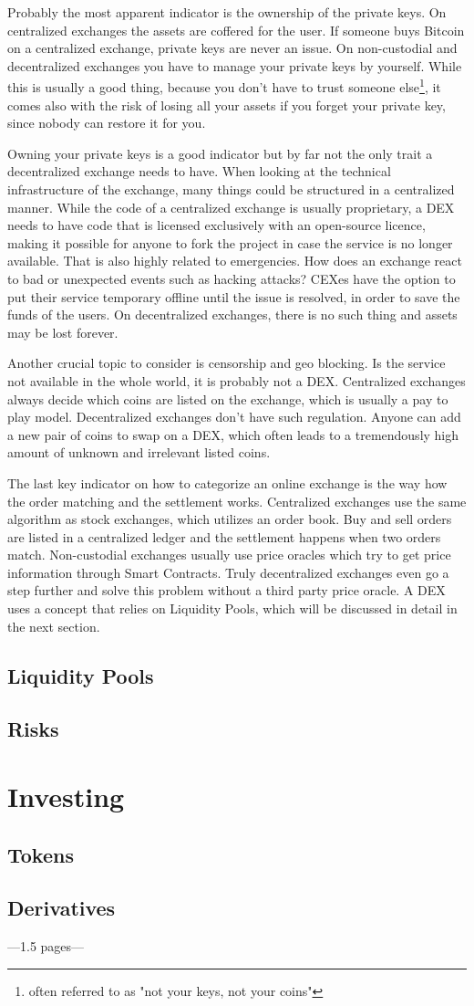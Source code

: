 Probably the most apparent indicator is the ownership of the private keys. On centralized exchanges the assets are coffered for the user. If someone buys Bitcoin on a centralized exchange, private keys are never an issue. On non-custodial and decentralized exchanges you have to manage your private keys by yourself. While this is usually a good thing, because you don't have to trust someone else\footnote{often referred to as "not your keys, not your coins"}, it comes also with the risk of losing all your assets if you forget your private key, since nobody can restore it for you.

Owning your private keys is a good indicator but by far not the only trait a decentralized exchange needs to have. When looking at the technical infrastructure of the exchange, many things could be structured in a centralized manner. While the code of a centralized exchange is usually proprietary, a DEX needs to have code that is licensed exclusively with an open-source licence, making it possible for anyone to fork the project in case the service is no longer available. That is also highly related to emergencies. How does an exchange react to bad or unexpected events such as hacking attacks? CEXes have the option to put their service temporary offline until the issue is resolved, in order to save the funds of the users. On decentralized exchanges, there is no such thing and assets may be lost forever.

Another crucial topic to consider is censorship and geo blocking. Is the service not available in the whole world, it is probably not a DEX. Centralized exchanges always decide which coins are listed on the exchange, which is usually a pay to play model. Decentralized exchanges don't have such regulation. Anyone can add a new pair of coins to swap on a DEX, which often leads to a tremendously high amount of unknown and irrelevant listed coins.

The last key indicator on how to categorize an online exchange is the way how the order matching and the settlement works. Centralized exchanges use the same algorithm as stock exchanges, which utilizes an order book. Buy and sell orders are listed in a centralized ledger and the settlement happens when two orders match. Non-custodial exchanges usually use price oracles which try to get price information through Smart Contracts. Truly decentralized exchanges even go a step further and solve this problem without a third party price oracle. A DEX uses a concept that relies on Liquidity Pools, which will be discussed in detail in the next section.

\subsection{Liquidity Pools}

\subsection{Risks}

\section{Investing}
\subsection{Tokens}
\subsection{Derivatives}
---1.5 pages---
